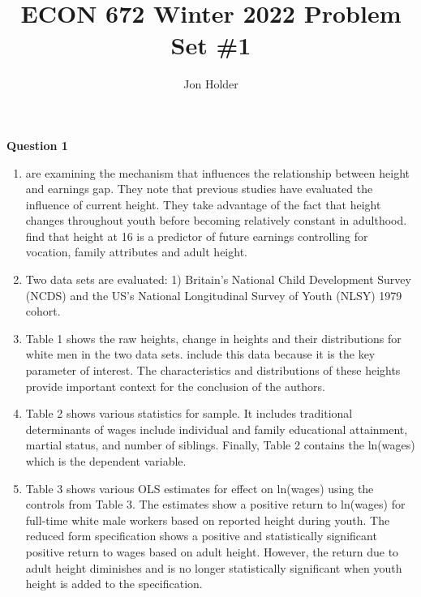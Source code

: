 \documentclass[12pt]{article}
\begin{document}
\title{ECON 672 Winter 2022 Problem Set \#1}
\author{Jon Holder}

\newcommand{\question}[1]{\textbf{\noindent Question #1}}
\newcommand{\tabindent}{\hspace{3mm}}

\newcommand{\todo}{\color{red}{\textbf{TODO}}}

\maketitle
\question{1}
    \begin{enumerate}[\indent a.]
        \item \textcite{Persico2004} are examining the mechanism that 
        influences the relationship between height and earnings gap. They note 
        that previous studies have evaluated the influence of current height.  
        They take advantage of the fact that height changes throughout youth 
        before becoming relatively constant in adulthood. 
        \citeauthor{Persico2004} find that height at 16 is a predictor of 
        future earnings controlling for vocation, family attributes and adult 
        height.
        
        \item Two data sets are evaluated: 1) Britain's National Child 
        Development Survey (NCDS) and the US's National Longitudinal Survey of 
        Youth (NLSY) 1979 cohort.

        \item Table 1 shows the raw heights, change in heights and their 
        distributions for white men in the two data sets. 
        \citeauthor{Persico2004} include this data because it is the key 
        parameter of interest.  The characteristics and distributions of these 
        heights provide important context for the conclusion of the authors.

        \item Table 2 shows various statistics for sample.  It includes 
        traditional determinants of wages include individual and family 
        educational attainment, martial status, and number of siblings. Finally, 
        Table 2 contains the ln(wages) which is the dependent variable.

        \item Table 3 shows various OLS estimates for effect on ln(wages) 
        using the controls from Table 3.  The estimates show a positive return
        to ln(wages) for full-time white male workers based on reported height 
        during youth. The reduced form specification shows a positive and 
        statistically significant positive return to wages based on adult 
        height. However, the return due to adult height diminishes and is 
        no longer statistically significant when youth height is added to the 
        specification.
                

\end{enumerate}
\end{document}
